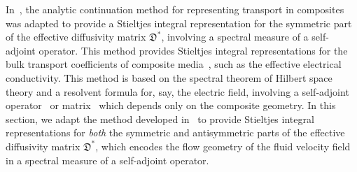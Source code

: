 \documentclass[english,12pt,jmp,graphicx]{revtex4-1}
\newcommand{\Dg}{\mathfrak{D}}
\begin{document}
In~\cite{Avellaneda:CMP-339,Avellaneda:PRL-753}, the analytic
continuation method for representing transport in composites was
adapted to provide a Stieltjes integral representation for the
symmetric part of the effective diffusivity matrix $\Dg^*$, involving
a spectral measure of a self-adjoint
operator. This method
provides Stieltjes integral representations for the bulk transport
coefficients of composite media~\cite{Golden:CMP-473}, such as the
effective electrical conductivity. This method is based on the spectral theorem
of Hilbert space theory and a resolvent formula for, say, the electric
field, involving a self-adjoint operator~\cite{Golden:CMP-473} or
matrix~\cite{Murphy:2015:CMS:13:4:825} which depends only on the
composite geometry. In this section, we adapt the
method developed in~\cite{Avellaneda:CMP-339,Avellaneda:PRL-753} to provide
Stieltjes integral representations for \emph{both} the symmetric and
antisymmetric parts of the effective diffusivity matrix $\Dg^*$, which
encodes the flow geometry of the fluid velocity field in a spectral
measure of a self-adjoint operator. 
\end{document}
